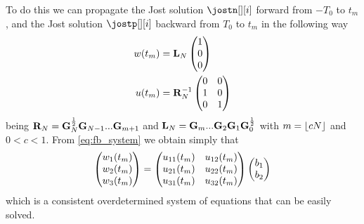 To do this we can propagate  the Jost solution $\jostn[][i]$ forward from $-T_0$ to $t_m$, and the Jost solution $\jostp[][i]$ backward from $T_0$ to $t_m$ in
the following way
\begin{subequations}
\begin{align}
    w(t_m) &= \matr{L}_N
               \begin{pmatrix}
                   1\\
                   0\\
                   0
               \end{pmatrix}\\
    u(t_m) &= \matr{R}_N^{-1}
                \begin{pmatrix}
                   0 & 0\\
                   1 & 0\\
                   0 & 1
               \end{pmatrix}
\end{align}
\end{subequations}
being $\matr{R}_N=\matr{G}_N^{\frac{1}{2}}\matr{G}_{N-1}...\matr{G}_{m+1}$ and $\matr{L}_N=\matr{G}_m...\matr{G}_2\matr{G}_1\matr{G}_0^{\frac{1}{2}}$ with $m=\floor{cN}$ and $0<c<1$.
From \eqref{eq:fb_system} we obtain simply that
\begin{align}
\begin{pmatrix}
       \fbw[1](t_m) \\
       \fbw[2](t_m) \\
       \fbw[3](t_m)
     \end{pmatrix}=
     \begin{pmatrix}
       \fbu[11](t_m) & \fbu[12](t_m)  \\
       \fbu[21](t_m) & \fbu[22](t_m)  \\
       \fbu[31](t_m) & \fbu[32](t_m)
     \end{pmatrix}
     \begin{pmatrix}
       b_1  \\
       b_2
     \end{pmatrix}
\end{align}
which is a consistent overdetermined system of equations that can be easily solved.

